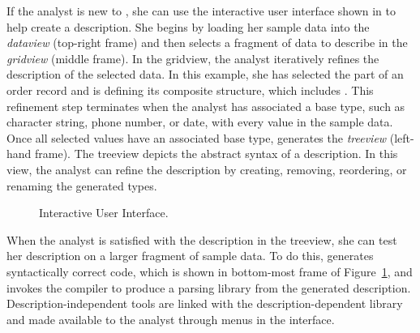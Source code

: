 If the analyst is new to \pads{}, she can use the interactive user
interface shown in  to help create a \pads{}
description.  She begins by loading her sample \dibbler{} data into
the {\it dataview} (top-right frame) and then selects a fragment of
data to describe in the {\it gridview} (middle frame).  In the
gridview, the analyst iteratively refines the description of the
selected data.  In this example, she has selected the 
part of an order record and is defining its composite structure, which
includes .  This refinement step terminates when the
analyst has associated a base type, such as character string, phone
number, or date, with every value in the sample data.  Once all
selected values have an associated base type, \textsc{\launchpads{}}
generates the {\it treeview} (left-hand frame).  The treeview depicts
the abstract syntax of a \pads{} description.  In this view, the
analyst can refine the description by creating, removing,
reordering, or renaming the generated types.
\begin{figure}
  \begin{center}
  \end{center}
  \caption{\launchpads{} Interactive User Interface.}
  \label{figure:launchpads}
\end{figure}

When the analyst is satisfied with the description in the treeview,
she can test her description on a larger fragment of sample data.  To
do this, \launchpads{} generates syntactically correct \pads{} code,
which is shown in bottom-most frame of Figure~\ref{figure:launchpads},
and invokes the \pads{} compiler to produce a parsing library from the
generated description.  Description-independent tools are linked with
the description-dependent library and made available to the analyst
through menus in the \launchpads{} interface.  

